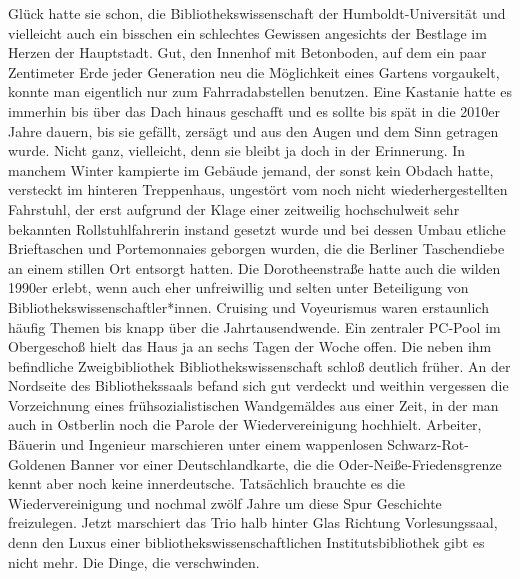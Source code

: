 \documentclass[a4paper,
fontsize=11pt,
oneside,
numbers=noperiodatend,
parskip=half-,
bibliography=totoc,
final
]{scrartcl}
\begin{document}
Glück hatte sie schon, die Bibliothekswissenschaft der
Humboldt-Universität und vielleicht auch ein bisschen ein schlechtes
Gewissen angesichts der Bestlage im Herzen der Hauptstadt. Gut, den
Innenhof mit Betonboden, auf dem ein paar Zentimeter Erde jeder
Generation neu die Möglichkeit eines Gartens vorgaukelt, konnte man
eigentlich nur zum Fahrradabstellen benutzen. Eine Kastanie hatte es
immerhin bis über das Dach hinaus geschafft und es sollte bis spät in
die 2010er Jahre dauern, bis sie gefällt, zersägt und aus den Augen und
dem Sinn getragen wurde. Nicht ganz, vielleicht, denn sie bleibt ja doch
in der Erinnerung. In manchem Winter kampierte im Gebäude jemand, der
sonst kein Obdach hatte, versteckt im hinteren Treppenhaus, ungestört
vom noch nicht wiederhergestellten Fahrstuhl, der erst aufgrund der
Klage einer zeitweilig hochschulweit sehr bekannten Rollstuhlfahrerin
instand gesetzt wurde und bei dessen Umbau etliche Brieftaschen und
Porte­mon­naies geborgen wurden, die die Berliner Taschendiebe an einem
stillen Ort entsorgt hatten. Die Dorotheenstraße hatte auch die wilden
1990er erlebt, wenn auch eher unfreiwillig und selten unter Beteiligung
von Bibliothekswissenschaftler*innen. Cruising und Voyeurismus waren
erstaunlich häufig Themen bis knapp über die Jahrtausendwende. Ein
zentraler PC-Pool im Obergeschoß hielt das Haus ja an sechs Tagen der
Woche offen. Die neben ihm befindliche Zweigbibliothek
Bibliothekswissenschaft schloß deutlich früher. An der Nordseite des
Bibliothekssaals befand sich gut verdeckt und weithin vergessen die
Vorzeichnung eines frühsozialistischen Wandgemäldes aus einer Zeit, in
der man auch in Ostberlin noch die Parole der Wiedervereinigung
hochhielt. Arbeiter, Bäuerin und Ingenieur marschieren unter einem
wappenlosen Schwarz-Rot-Goldenen Banner vor einer Deutschlandkarte, die
die Oder-Neiße-Friedensgrenze kennt aber noch keine innerdeutsche.
Tatsächlich brauchte es die Wiedervereinigung und nochmal zwölf Jahre um
diese Spur Geschichte freizulegen. Jetzt marschiert das Trio halb hinter
Glas Richtung Vorlesungssaal, denn den Luxus einer
bibliothekswissenschaftlichen Institutsbibliothek gibt es nicht mehr.
Die Dinge, die verschwinden.
\end{document}
